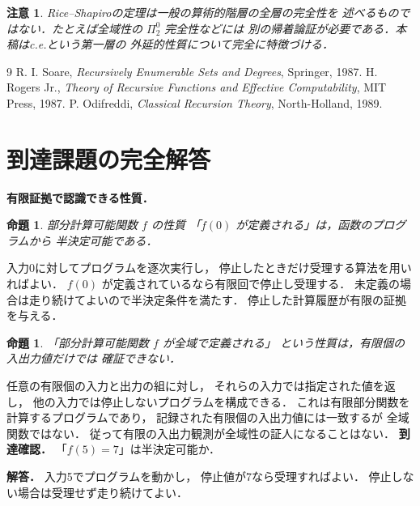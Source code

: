 \documentclass[a5paper,10pt,onecolumn]{jsarticle}
\makeatletter
\theoremstyle{mathnotetheorem}
\newtheorem{proposition}[theorem]{命題}
\newtheorem{remark}[theorem]{注意}
\renewcommand{\proofname}{証明}
\renewenvironment{proof}[1][\proofname]{%
  \par\pushQED{\qed}\normalfont\topsep4\p@\@plus2\p@\relax
  \trivlist\item[\hskip\labelsep\bfseries #1]\ignorespaces
}{\popQED\endtrivlist\@endpefalse}
\makeatother
\begin{document}
\begin{remark}
Rice--Shapiroの定理は一般の算術的階層の全層の完全性を
述べるものではない．たとえば全域性の $\Pi^0_2$ 完全性などには
別の帰着論証が必要である．本稿はc.e.という第一層の
外延的性質について完全に特徴づける．
\end{remark}

\begin{thebibliography}{9}
 R. I. Soare, \emph{Recursively Enumerable Sets and Degrees},
 Springer, 1987.
 H. Rogers Jr., \emph{Theory of Recursive Functions and
 Effective Computability}, MIT Press, 1987.
 P. Odifreddi, \emph{Classical Recursion Theory},
 North-Holland, 1989.
\end{thebibliography}

\section{到達課題の完全解答}
\noindent\textbf{有限証拠で認識できる性質．}
\begin{proposition}
部分計算可能関数 $f$ の性質
「$f(0)$ が定義される」は，函数のプログラムから
半決定可能である．
\end{proposition}
\begin{proof}
入力0に対してプログラムを逐次実行し，
停止したときだけ受理する算法を用いればよい．
$f(0)$ が定義されているなら有限回で停止し受理する．
未定義の場合は走り続けてよいので半決定条件を満たす．
停止した計算履歴が有限の証拠を与える．
\end{proof}
\begin{proposition}
「部分計算可能関数 $f$ が全域で定義される」
という性質は，有限個の入出力値だけでは
確証できない．
\end{proposition}
\begin{proof}
任意の有限個の入力と出力の組に対し，
それらの入力では指定された値を返し，
他の入力では停止しないプログラムを構成できる．
これは有限部分関数を計算するプログラムであり，
記録された有限個の入出力値には一致するが
全域関数ではない．
従って有限の入出力観測が全域性の証人になることはない．
\end{proof}
\noindent\textbf{到達確認．}
「$f(5)=7$」は半決定可能か．
\par\noindent\textbf{解答．}
入力5でプログラムを動かし，
停止値が7なら受理すればよい．
停止しない場合は受理せず走り続けてよい．
\end{document}

